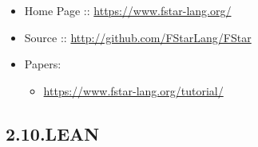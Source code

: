 \documentclass[12pt,twoside]{article}
\begin{document}
\begin{itemize}%

\item{}
Home Page :: \href{https://www.fstar-lang.org/}{{\ttfamily https://\hspace{0pt}www.\hspace{0pt}fstar-\hspace{0pt}lang.\hspace{0pt}org/\hspace{0pt}}}%

\item{}
Source :: \href{http://github.com/FStarLang/FStar}{{\ttfamily http://\hspace{0pt}github.\hspace{0pt}com/\hspace{0pt}FStarLang/\hspace{0pt}FStar}}%

\item{}
Papers:%

\begin{itemize}[noitemsep,topsep=\mdcompacttopsep]%

\item{}\href{https://www.fstar-lang.org/tutorial/}{{\ttfamily https://\hspace{0pt}www.\hspace{0pt}fstar-\hspace{0pt}lang.\hspace{0pt}org/\hspace{0pt}tutorial/\hspace{0pt}}}%
\end{itemize}%
\end{itemize}%

\subsection{2.10.\hspace*{0.5em}LEAN}\label{sec-lean}%
\end{document}
